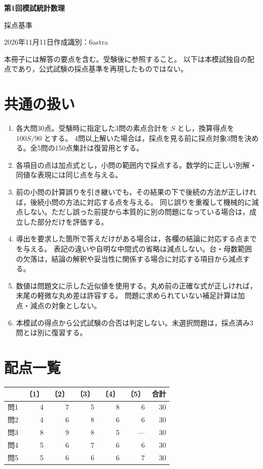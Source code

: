 \documentclass[a4paper,11pt]{ltjsarticle}
\begin{document}
\begin{center}
{\LARGE\bfseries 第1回模試\quad 統計数理}\par\medskip
{\Large 採点基準}\par\medskip
2026年11月11日\quad 作成識別：6astra
\end{center}
\noindent 本冊子には解答の要点を含む。受験後に参照すること。
以下は本模試独自の配点であり，公式試験の採点基準を再現したものではない。

\section*{共通の扱い}
\begin{enumerate}[label=\arabic*.,leftmargin=2em,itemsep=0.7em]
\item 各大問30点。受験時に指定した3問の素点合計を $S$ とし，換算得点を $100S/90$ とする。
4問以上解いた場合は，採点を見る前に採点対象3問を決める。全5問の150点集計は復習用とする。
\item 各項目の点は加点式とし，小問の範囲内で採点する。数学的に正しい別解・同値な表現には同じ点を与える。
\item 前の小問の計算誤りを引き継いでも，その結果の下で後続の方法が正しければ，後続小問の方法に対応する点を与える。
同じ誤りを重複して機械的に減点しない。ただし誤った前提から本質的に別の問題になっている場合は，成立した部分だけを評価する。
\item 導出を要求した箇所で答えだけがある場合は，各欄の結論に対応する点までを与える。
表記の違いや自明な中間式の省略は減点しない。台・母数範囲の欠落は，結論の解釈や妥当性に関係する場合に対応する項目から減点する。
\item 数値は問題文に示した近似値を使用する。丸め前の正確な式が正しければ，末尾の軽微な丸め差は許容する。
問題に求められていない補足計算は加点・減点の対象としない。
\item 本模試の得点から公式試験の合否は判定しない。未選択問題は，採点済み3問とは別に復習する。
\end{enumerate}

\section*{配点一覧}
\begin{center}
\begin{tabular}{lrrrrrr}
\toprule
 &〔1〕&〔2〕&〔3〕&〔4〕&〔5〕&合計\\
\midrule
問1&4&7&5&8&6&30\\
問2&4&6&8&6&6&30\\
問3&8&9&8&5&---&30\\
問4&5&6&7&6&6&30\\
問5&5&6&6&6&7&30\\
\bottomrule
\end{tabular}
\end{center}
\newpage
\end{document}
